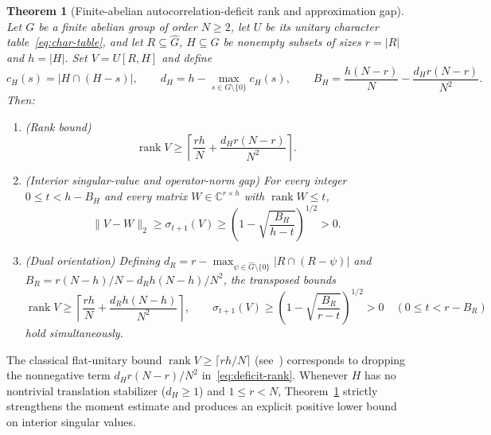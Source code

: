 \documentclass[11pt,reqno]{amsart}
\numberwithin{equation}{section}
\newtheorem{theorem}{Theorem}[section]
\theoremstyle{definition}
\theoremstyle{remark}
\newcommand{\C}{\mathbb{C}}
\newcommand{\rank}{\operatorname{rank}}
\begin{document}
\begin{theorem}[Finite-abelian autocorrelation-deficit rank and approximation gap]
\label{thm:deficit}
Let $G$ be a finite abelian group of order $N\ge 2$, let $U$ be its unitary character table~\eqref{eq:char-table}, and let $R\subseteq\widehat{G}$, $H\subseteq G$ be nonempty subsets of sizes $r=|R|$ and $h=|H|$. Set $V=U[R,H]$ and define
\begin{equation}
\label{eq:deficit-defs}
c_H(s) = |H\cap(H-s)|,\qquad
d_H = h - \max_{s\in G\setminus\{0\}} c_H(s),\qquad
B_H = \frac{h(N-r)}{N} - \frac{d_H r(N-r)}{N^2}.
\end{equation}
Then:
\begin{enumerate}[label=(\alph*),leftmargin=2em]
\item \emph{(Rank bound)}
\begin{equation}
\label{eq:deficit-rank}
\rank V \ge \left\lceil \frac{rh}{N} + \frac{d_H r(N-r)}{N^2}\right\rceil.
\end{equation}
\item \emph{(Interior singular-value and operator-norm gap)} For every integer $0\le t < h - B_H$ and every matrix $W\in\C^{r\times h}$ with $\rank W\le t$,
\begin{equation}
\label{eq:deficit-gap}
\|V - W\|_2 \ge \sigma_{t+1}(V) \ge \left(1 - \sqrt{\frac{B_H}{h - t}}\right)^{1/2} > 0.
\end{equation}
\item \emph{(Dual orientation)} Defining $d_R = r - \max_{\psi\in\widehat{G}\setminus\{0\}} |R\cap(R-\psi)|$ and $B_R = r(N-h)/N - d_R h(N-h)/N^2$, the transposed bounds
\begin{equation}
\label{eq:deficit-dual}
\rank V \ge \left\lceil \frac{rh}{N} + \frac{d_R h(N-h)}{N^2}\right\rceil,\qquad
\sigma_{t+1}(V) \ge \left(1 - \sqrt{\frac{B_R}{r - t}}\right)^{1/2} > 0\quad (0\le t < r - B_R)
\end{equation}
hold simultaneously.
\end{enumerate}
\end{theorem}

The classical flat-unitary bound $\rank V \ge \lceil rh/N\rceil$ (see~\cite{deW06}) corresponds to dropping the nonnegative term $d_H r(N-r)/N^2$ in~\eqref{eq:deficit-rank}. Whenever $H$ has no nontrivial translation stabilizer ($d_H\ge 1$) and $1\le r<N$, Theorem~\ref{thm:deficit} strictly strengthens the moment estimate and produces an explicit positive lower bound on interior singular values.
\end{document}
